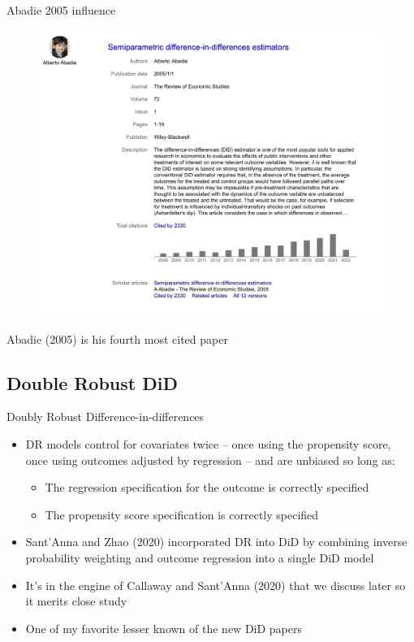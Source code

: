 \documentclass{beamer}
\begin{document}
\begin{frame}{Abadie 2005 influence}

	\begin{figure}
	\includegraphics[scale=0.25]{./lecture_includes/abadie_restud_ipw}
	\end{figure}Abadie (2005) is his fourth most cited paper

\end{frame}




\subsection{Double Robust DiD}

\begin{frame}{Doubly Robust Difference-in-differences}

\begin{itemize}
\item DR models control for covariates twice -- once using the propensity score, once using outcomes adjusted by regression -- and are unbiased so long as:
	\begin{itemize}
	\item The regression specification for the outcome is correctly specified
	\item The propensity score specification is correctly specified
	\end{itemize}
\item Sant'Anna and Zhao (2020) incorporated DR into DiD by combining inverse probability weighting and outcome regression into a single DiD model
\item It's in the engine of Callaway and Sant'Anna (2020) that we discuss later so it merits close study
\item One of my favorite lesser known of the new DiD papers
\end{itemize}

\end{frame}
\end{document}
